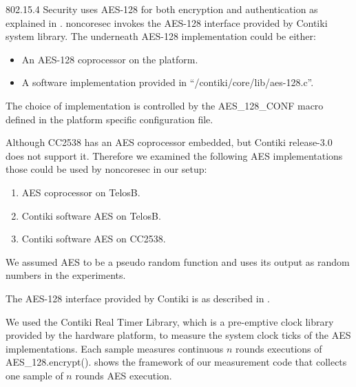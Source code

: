 802.15.4 Security uses AES-128 for both encryption and authentication as explained in . noncoresec invokes the AES-128 interface provided by Contiki system library. The underneath AES-128 implementation could be either:
\begin{itemize}
	\item An AES-128 coprocessor on the platform.
	\item A software implementation provided in ``/contiki/core/lib/aes-128.c''.
\end{itemize}

The choice of implementation is controlled by the AES\_128\_CONF macro defined in the platform specific configuration file.

Although CC2538 has an AES coprocessor embedded, but Contiki release-3.0 does not support it. Therefore we examined the following AES implementations those could be used by noncoresec in our setup:

\begin{enumerate}
	\item AES coprocessor on TelosB.
	\item Contiki software AES on TelosB.
	\item Contiki software AES on CC2538.
\end{enumerate}

We assumed AES to be a pseudo random function and uses its output as random numbers in the experiments.

The AES-128 interface provided by Contiki is as described in .

 

We used the Contiki Real Timer Library\cite{RTimer}, which is a pre-emptive clock library provided by the hardware platform, to measure the system clock ticks of the AES implementations. Each sample measures continuous $n$ rounds executions of AES\_128.encrypt().  shows the framework of our measurement code that collects one sample of $n$ rounds AES execution.

 

